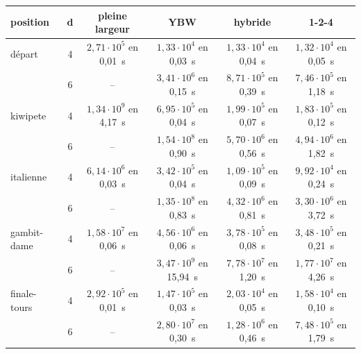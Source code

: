 \begin{tabular}{lccccc}
\toprule
position & d & pleine largeur & YBW & hybride & 1-2-4\\
\midrule
départ & 4 & $2{,}71\cdot 10^{5}$ en 0{,}01~s & $1{,}33\cdot 10^{4}$ en 0{,}03~s & $1{,}33\cdot 10^{4}$ en 0{,}04~s & $1{,}32\cdot 10^{4}$ en 0{,}05~s\\
 & 6 & -- & $3{,}41\cdot 10^{6}$ en 0{,}15~s & $8{,}71\cdot 10^{5}$ en 0{,}39~s & $7{,}46\cdot 10^{5}$ en 1{,}18~s\\
kiwipete & 4 & $1{,}34\cdot 10^{9}$ en 4{,}17~s & $6{,}95\cdot 10^{5}$ en 0{,}04~s & $1{,}99\cdot 10^{5}$ en 0{,}07~s & $1{,}83\cdot 10^{5}$ en 0{,}12~s\\
 & 6 & -- & $1{,}54\cdot 10^{8}$ en 0{,}90~s & $5{,}70\cdot 10^{6}$ en 0{,}56~s & $4{,}94\cdot 10^{6}$ en 1{,}82~s\\
italienne & 4 & $6{,}14\cdot 10^{6}$ en 0{,}03~s & $3{,}42\cdot 10^{5}$ en 0{,}04~s & $1{,}09\cdot 10^{5}$ en 0{,}09~s & $9{,}92\cdot 10^{4}$ en 0{,}24~s\\
 & 6 & -- & $1{,}35\cdot 10^{8}$ en 0{,}83~s & $4{,}32\cdot 10^{6}$ en 0{,}81~s & $3{,}30\cdot 10^{6}$ en 3{,}72~s\\
gambit-dame & 4 & $1{,}58\cdot 10^{7}$ en 0{,}06~s & $4{,}56\cdot 10^{6}$ en 0{,}06~s & $3{,}78\cdot 10^{5}$ en 0{,}08~s & $3{,}48\cdot 10^{5}$ en 0{,}21~s\\
 & 6 & -- & $3{,}47\cdot 10^{9}$ en 15{,}94~s & $7{,}78\cdot 10^{7}$ en 1{,}20~s & $1{,}77\cdot 10^{7}$ en 4{,}26~s\\
finale-tours & 4 & $2{,}92\cdot 10^{5}$ en 0{,}01~s & $1{,}47\cdot 10^{5}$ en 0{,}03~s & $2{,}03\cdot 10^{4}$ en 0{,}05~s & $1{,}58\cdot 10^{4}$ en 0{,}10~s\\
 & 6 & -- & $2{,}80\cdot 10^{7}$ en 0{,}30~s & $1{,}28\cdot 10^{6}$ en 0{,}46~s & $7{,}48\cdot 10^{5}$ en 1{,}79~s\\
\bottomrule
\end{tabular}
